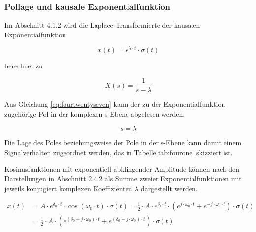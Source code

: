 \clearpage 

\subsubsection{Pollage und kausale Exponentialfunktion}

\noindent Im Abschnitt 4.1.2 wird die Laplace-Transformierte der kausalen Exponentialfunktion

\begin{equation}\label{eq:fourtwentysix}
x\left(t\right)=e^{\lambda \cdot t} \cdot \sigma \left(t\right)
\end{equation}

\noindent berechnet zu

\begin{equation}\label{eq:fourtwentyseven}
X\left(s\right)=\frac{1}{s-\lambda }
\end{equation}

\noindent Aus Gleichung \eqref{eq:fourtwentyseven} kann der zu der Exponentialfunktion zugehörige Pol in der komplexen s-Ebene abgelesen werden.

\begin{equation}\label{eq:fourtwentyeight}
s=\lambda 
\end{equation}

\noindent Die Lage des Poles beziehungsweise der Pole in der s-Ebene kann damit einem Signalverhalten zugeordnet werden, das in Tabelle\ref{tab:fourone} skizziert ist.\medskip

\noindent Kosinusfunktionen mit exponentiell abklingender Amplitude k\"{o}nnen nach den Darstellungen in Abschnitt 2.4.2 als Summe zweier Exponentialfunktionen mit jeweils konjugiert komplexen Koeffizienten $\lambda$ dargestellt werden. 


\begin{equation}\label{eq:fourtwentynine}
\begin{split}
x\left(t\right) & = A\cdot e^{\delta _{0} \cdot t} \cdot \cos \left(\omega _{0} \cdot t\right)\cdot \sigma \left(t\right)=\frac{1}{2} \cdot A\cdot e^{\delta _{0} \cdot t} \cdot \left(e^{j\cdot \omega _{0} \cdot t} +e^{-j\cdot \omega _{0} \cdot t} \right)\cdot \sigma \left(t\right) \\ 
& = \frac{1}{2} \cdot A\cdot \left(e^{\left(\delta _{0} +j\cdot \omega _{0} \right)\cdot t} +e^{\left(\delta _{0} -j\cdot \omega _{0} \right)\cdot t} \right)\cdot \sigma \left(t\right)
\end{split}
\end{equation}

